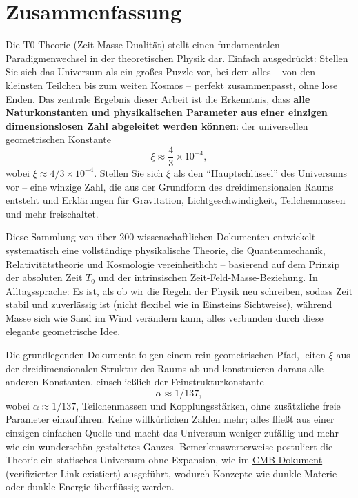 \section*{Zusammenfassung}
	Die T0-Theorie (Zeit-Masse-Dualität) stellt einen fundamentalen Paradigmenwechsel in der theoretischen Physik dar. Einfach ausgedrückt: Stellen Sie sich das Universum als ein großes Puzzle vor, bei dem alles – von den kleinsten Teilchen bis zum weiten Kosmos – perfekt zusammenpasst, ohne lose Enden. Das zentrale Ergebnis dieser Arbeit ist die Erkenntnis, dass \textbf{alle Naturkonstanten und physikalischen Parameter aus einer einzigen dimensionslosen Zahl abgeleitet werden können}: der universellen geometrischen Konstante
	\[
	\xi \approx \frac{4}{3} \times 10^{-4},
	\]
	wobei $\xi \approx 4/3 \times 10^{-4}$. Stellen Sie sich $\xi$ als den ``Hauptschlüssel'' des Universums vor – eine winzige Zahl, die aus der Grundform des dreidimensionalen Raums entsteht und Erklärungen für Gravitation, Lichtgeschwindigkeit, Teilchenmassen und mehr freischaltet.
	
	Diese Sammlung von über 200 wissenschaftlichen Dokumenten entwickelt systematisch eine vollständige physikalische Theorie, die Quantenmechanik, Relativitätstheorie und Kosmologie vereinheitlicht – basierend auf dem Prinzip der absoluten Zeit $T_0$ und der intrinsischen Zeit-Feld-Masse-Beziehung. In Alltagssprache: Es ist, als ob wir die Regeln der Physik neu schreiben, sodass Zeit stabil und zuverlässig ist (nicht flexibel wie in Einsteins Sichtweise), während Masse sich wie Sand im Wind verändern kann, alles verbunden durch diese elegante geometrische Idee.
	
	Die grundlegenden Dokumente folgen einem rein geometrischen Pfad, leiten $\xi$ aus der dreidimensionalen Struktur des Raums ab und konstruieren daraus alle anderen Konstanten, einschließlich der Feinstrukturkonstante
	\[
	\alpha \approx 1/137,
	\]
	wobei $\alpha \approx 1/137$, Teilchenmassen und Kopplungsstärken, ohne zusätzliche freie Parameter einzuführen. Keine willkürlichen Zahlen mehr; alles fließt aus einer einzigen einfachen Quelle und macht das Universum weniger zufällig und mehr wie ein wunderschön gestaltetes Ganzes. Bemerkenswerterweise postuliert die Theorie ein statisches Universum ohne Expansion, wie im \href{https://github.com/jpascher/T0-Time-Mass-Duality/blob/main/2/pdf/140_T0_CMB_Donoghue_Analyse_En.pdf}{CMB-Dokument} (verifizierter Link existiert) ausgeführt, wodurch Konzepte wie dunkle Materie oder dunkle Energie überflüssig werden.
	
